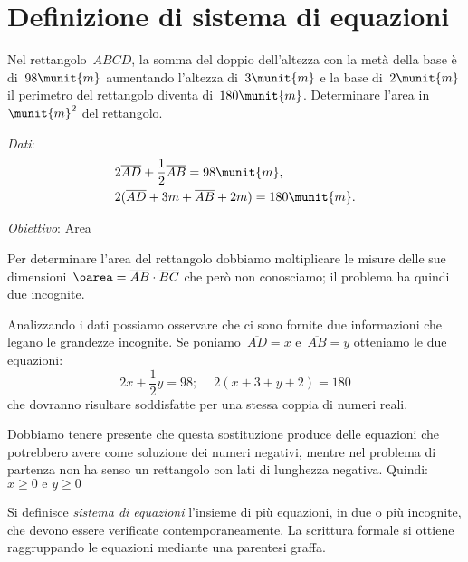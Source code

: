 \section{Definizione di sistema di equazioni}
\label{sec:sist_definizione}

\begin{problema}{}{}
\label{pr:22.1}
Nel rettangolo~\(ABCD\), la somma del doppio dell'altezza con la metà 
della base è di~\(98\munit{m}\) aumentando l'altezza di~\(3\munit{m}\) e 
la base di~\(2\munit{m}\) il perimetro del rettangolo diventa 
di~\(180\munit{m}\). 
Determinare l'area in~\(\munit{m}^{2}\) del rettangolo.
\end{problema}
\begin{htmulticols}{2}
\emph{Dati}:
\begin{align*}
&2\overline{AD}+\frac{1}{2}\overline{AB}=98\munit{m},\\
&2(\overline{AD}+3m+\overline{AB}+2m)=180\munit{m}.
\end{align*}

\emph{Obiettivo}: Area

{}
\end{htmulticols}

Per determinare l'area del rettangolo dobbiamo moltiplicare le misure 
delle sue dimensioni~\(\oarea=\overline{AB}\cdot\overline{BC}\)
che però non conosciamo; il problema ha quindi due incognite.

Analizzando i dati possiamo osservare che ci sono fornite due
informazioni che legano le grandezze incognite. 
Se poniamo~\(\overline{AD}=x\) e~\(\overline{AB}=y\)
otteniamo le due equazioni:
\[2x+\frac{1}{2}y=98;\quad~2(x+3+y+2)=180\]
che dovranno risultare soddisfatte per una stessa coppia di numeri
reali.

\begin{osservazione}{}{}
Dobbiamo tenere presente che questa sostituzione produce delle equazioni 
che potrebbero avere come soluzione dei numeri negativi, mentre nel 
problema di partenza non ha senso un rettangolo con lati di lunghezza 
negativa.
Quindi:~\(x \geqslant 0 \text{ e } y \geqslant 0\)
\end{osservazione}

\begin{definizione}{}{}
Si definisce \emph{sistema di equazioni} l'insieme di più equazioni, 
in due o più incognite, che devono essere verificate contemporaneamente. 
La scrittura formale si ottiene raggruppando le equazioni mediante una 
parentesi graffa.
\end{definizione}

